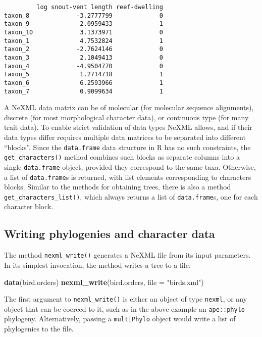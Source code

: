 \documentclass[author-year, review, 11pt]{components/elsarticle} %
\newenvironment{Shaded}{\begin{snugshade}}{\end{snugshade}}
\newcommand{\KeywordTok}[1]{\textcolor[rgb]{0.13,0.29,0.53}{\textbf{{#1}}}}
\newcommand{\DataTypeTok}[1]{\textcolor[rgb]{0.13,0.29,0.53}{{#1}}}
\newcommand{\StringTok}[1]{\textcolor[rgb]{0.31,0.60,0.02}{{#1}}}
\newcommand{\NormalTok}[1]{{#1}}
\begin{document}
\begin{verbatim}
         log snout-vent length reef-dwelling
taxon_8             -3.2777799             0
taxon_9              2.0959433             1
taxon_10             3.1373971             0
taxon_1              4.7532824             1
taxon_2             -2.7624146             0
taxon_3              2.1049413             0
taxon_4             -4.9504770             0
taxon_5              1.2714718             1
taxon_6              6.2593966             1
taxon_7              0.9099634             1
\end{verbatim}

A NeXML data matrix can be of molecular (for molecular sequence
alignments), discrete (for most morphological character data), or
continuous type (for many trait data). To enable strict validation of
data types NeXML allows, and if their data types differ requires
multiple data matrices to be separated into different ``blocks''. Since
the \texttt{data.frame} data structure in R has no such constraints, the
\texttt{get\_characters()} method combines such blocks as separate
columns into a single \texttt{data.frame} object, provided they
correspond to the same taxa. Otherwise, a list of \texttt{data.frame}s
is returned, with list elements corresponding to characters blocks.
Similar to the methods for obtaining trees, there is also a method
\texttt{get\_characters\_list()}, which always returns a list of
\texttt{data.frame}s, one for each character block.

\subsection{Writing phylogenies and character
data}\label{writing-phylogenies-and-character-data}

The method \texttt{nexml\_write()} generates a NeXML file from its input
parameters. In its simplest invocation, the method writes a tree to a
file:

\begin{Shaded}
\begin{Highlighting}[]
\KeywordTok{data}\NormalTok{(bird.orders)}
\KeywordTok{nexml_write}\NormalTok{(bird.orders, }\DataTypeTok{file =} \StringTok{"birds.xml"}\NormalTok{)}
\end{Highlighting}
\end{Shaded}

The first argument to \texttt{nexml\_write()} is either an object of
type \texttt{nexml}, or any object that can be coerced to it, such as in
the above example an \texttt{ape::phylo} phylogeny. Alternatively,
passing a \texttt{multiPhylo} object would write a list of phylogenies
to the file.
\end{document}
